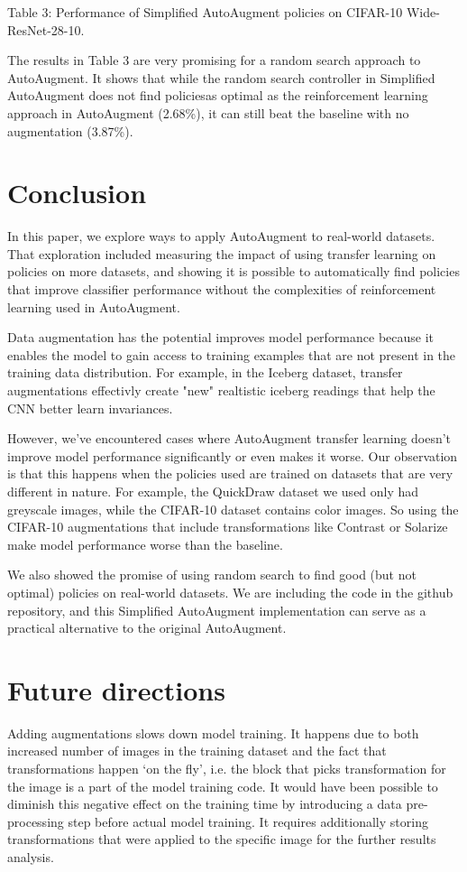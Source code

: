 \documentclass[10pt,twocolumn,letterpaper]{article}
\begin{document}
Table 3: Performance of Simplified AutoAugment policies on CIFAR-10 Wide-ResNet-28-10.

The results in Table 3 are very promising for a random search approach to AutoAugment.  It shows that while the random search controller in Simplified AutoAugment does not find policiesas optimal as the reinforcement learning approach in AutoAugment (2.68\%), it can still beat the baseline with no augmentation (3.87\%).   

\section{Conclusion}

In this paper, we explore ways to apply AutoAugment to real-world datasets. That exploration included measuring the impact of using transfer learning on policies on more datasets, and showing it is possible to automatically find policies that improve classifier performance without the complexities of reinforcement learning used in AutoAugment. 

Data augmentation has the potential improves model performance because it enables the model to gain access to training examples that are not present in the training data distribution. For example, in the Iceberg dataset, transfer augmentations effectivly create "new" realtistic iceberg readings that help the CNN better learn invariances. 

However, we’ve encountered cases where AutoAugment transfer learning doesn’t improve model performance significantly or even makes it worse. Our observation is that this happens when the policies used are trained on datasets that are very different in nature. For example, the QuickDraw dataset we used only had greyscale images, while the CIFAR-10 dataset contains color images. So using the CIFAR-10 augmentations that include transformations like Contrast or Solarize make model performance worse than the baseline. 

We also showed the promise of using random search to find good (but not optimal) policies on real-world datasets.  We are including the code in the github repository, and this Simplified AutoAugment implementation can serve as a practical alternative to the original AutoAugment.

\section{Future directions}
Adding augmentations slows down model training. It happens due to both increased number of images in the training dataset and the fact that transformations happen ‘on the fly’, i.e. the block that picks transformation for the image is a part of the model training code. It would have been possible to diminish this negative effect on the training time by introducing a data pre-processing step before actual model training. It requires additionally storing transformations that were applied to the specific image for the further results analysis.
\end{document}
